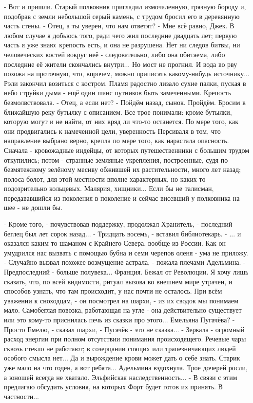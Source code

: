- Вот и пришли.
Старый полковник пригладил измочаленную, грязную бороду и, подобрав с земли небольшой серый камень, с трудом бросил его в деревянную часть стены.
- Отец, а ты уверен, что нам ответят?
- Мне всё равно, Джек. В любом случае я добьюсь того, ради чего жил последние двадцать лет; первую часть я уже знаю: крепость есть, и она не разрушена. Нет ни следов битвы, ни человеческих костей вокруг неё - следовательно, либо она обитаема, либо последние её жители скончались внутри... Но мост не прогнил. И вода во рву похожа на проточную, что, впрочем, можно приписать какому-нибудь источнику...
Рэли закончил возиться с костром. Пламя радостно лизало сухие палки, пуская в небо струйки дыма - ещё один шанс путников быть замеченными. Крепость безмолвствовала.
- Отец, а если нет?
- Пойдём назад, сынок. Пройдём. Бросим в ближайшую реку бутылку с описанием.
Все трое понимали: кроме бутылки, которую могут и не найти, от них вряд ли что-то останется. По мере того, как они продвигались к намеченной цели, уверенность Персиваля в том, что направление выбрано верно, крепла по мере того, как нарастала опасность. Сначала - кровожадные индейцы, от которых путешественники с большим трудом откупились; потом - странные земляные укрепления, построенные, судя по безмятежному зелёному месиву обжившей их растительности, много лет назад; полоса болот, для этой местности вполне характерных, но каких-то подозрительно кольцевых. Малярия, хищники... Если бы не талисман, передававшийся из поколения в поколение и сейчас висевший у полковника на шее - не дошли бы.

- Кроме того, - почувствовав поддержку, продолжал Хранитель, - последний беглец был лет сорок назад...
- Тридцать восемь, - вставил библиотекарь.
- ... и оказался каким-то шаманом с Крайнего Севера, вообще из России. Как он умудрился нас вызвать с помощью бубна и семи черепов оленя - ума не приложу.
- Случайно вызвал похожее возмущение астрала, - пожала плечами Адельмина.
- Предпоследний - больше полувека... Франция. Бежал от Революции. Я хочу лишь сказать, что, по всей видимости, ритуал вызова во внешнем мире утрачен, и способов узнать, что там происходит, у нас почти не осталось. При всём уважении к сноходцам, - он посмотрел на шархи, - из их сводок мы понимаем мало. Самобеглая повозка, работающая на угле - она действительно существует или это кому-то приснилась печь из сказки про этого... Емельяна Пугачёва?
- Просто Емелю, - сказал шархи, - Пугачёв - это не сказка...
- Зеркала - огромный расход энергии при полном отсутствии понимания происходящего. Речевые чары сквозь стекло не работают; в созерцании спящих или трапезничающих людей особого смысла нет... Да и вырождение крови может дать о себе знать. Старик уже мало на что годен, а вот ребята...
Адельмина вздохнула. Трое дочерей росли, а юношей всегда не хватало. Эльфийская наследственность...
- В связи с этим предлагаю обсудить условия, на которых Форт будет готов их принять. В частности...

